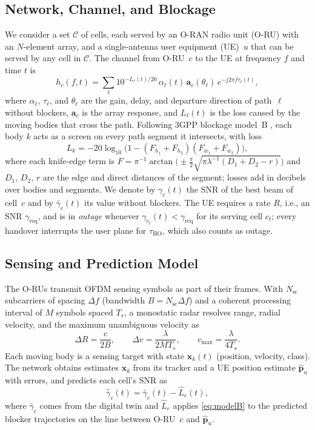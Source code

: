\documentclass[conference]{IEEEtran}
\begin{document}
\subsection{Network, Channel, and Blockage}
We consider a set $\mathcal{C}$ of cells, each served by an O-RAN radio
unit (O-RU) with an $N$-element array, and a single-antenna user
equipment (UE)~$u$ that can be served by any cell in $\mathcal{C}$. The
channel from O-RU~$c$ to the UE at frequency $f$ and time $t$ is
\begin{equation}
h_{c}(f,t)=\sum_{\ell} 10^{-L_\ell(t)/20}\,\alpha_\ell(t)\,
\mathbf{a}_c(\theta_\ell)\,e^{-j2\pi f\tau_\ell(t)},
\label{eq:channel}
\end{equation}
where $\alpha_\ell$, $\tau_\ell$, and $\theta_\ell$ are the gain, delay,
and departure direction of path~$\ell$ without blockers, $\mathbf{a}_c$
is the array response, and $L_\ell(t)$ is the loss caused by the moving
bodies that cross the path. Following 3GPP blockage model~B
\cite{3gpp38901}, each body $k$ acts as a screen on every path segment it
intersects, with loss
\begin{equation}
L_k=-20\log_{10}\!\bigl(1-(F_{h_1}+F_{h_2})(F_{w_1}+F_{w_2})\bigr),
\label{eq:modelB}
\end{equation}
where each knife-edge term is
$F=\pi^{-1}\arctan\!\bigl(\pm\frac{\pi}{2}\sqrt{\pi\lambda^{-1}(D_1+D_2-r)}\bigr)$
and $D_1$, $D_2$, $r$ are the edge and direct distances of the segment;
losses add in decibels over bodies and segments. We denote by
$\gamma_c(t)$ the SNR of the best beam of cell~$c$ and by
$\bar\gamma_c(t)$ its value without blockers. The UE requires a rate
$R$, i.e., an SNR $\gamma_{\mathrm{req}}$, and is in \emph{outage}
whenever $\gamma_{c_t}(t)<\gamma_{\mathrm{req}}$ for its serving cell
$c_t$; every handover interrupts the user plane for $\tau_{\mathrm{HO}}$,
which also counts as outage.

\subsection{Sensing and Prediction Model}
The O-RUs transmit OFDM sensing symbols as part of their frames. With
$N_{\mathrm{sc}}$ subcarriers of spacing $\Delta f$ (bandwidth
$B=N_{\mathrm{sc}}\Delta f$) and a coherent processing interval of $M$
symbols spaced $T_s$, a monostatic radar resolves range, radial
velocity, and the maximum unambiguous velocity as
\begin{equation}
\Delta R=\frac{c}{2B},\qquad
\Delta v=\frac{\lambda}{2MT_s},\qquad
v_{\max}=\frac{\lambda}{4T_s}.
\label{eq:res}
\end{equation}
Each moving body is a sensing target with state $\mathbf{x}_k(t)$
(position, velocity, class). The network obtains estimates
$\hat{\mathbf{x}}_k$ from its tracker and a UE position estimate
$\hat{\mathbf{p}}_u$ with errors, and predicts each cell's SNR as
\begin{equation}
\hat\gamma_c(t)=\bar\gamma_c(t)-\hat L_c(t),
\label{eq:pred}
\end{equation}
where $\bar\gamma_c$ comes from the digital twin and $\hat L_c$ applies
\eqref{eq:modelB} to the predicted blocker trajectories on the line
between O-RU~$c$ and $\hat{\mathbf{p}}_u$.
\end{document}
